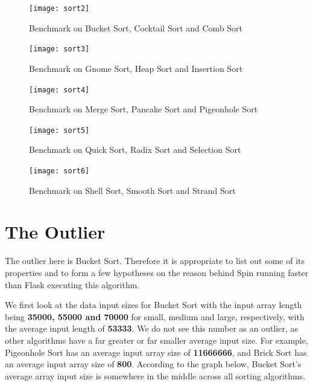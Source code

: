 \bigskip
\begin{figure}[hp]
\centering
\texttt{[image: sort2]}
\caption{\footnotesize{Benchmark on Bucket Sort, Cocktail Sort and Comb Sort}}
\captionsetup{aboveskip=0pt,font=it}
\end{figure}
\bigskip

\bigskip
\begin{figure}[hp]
\centering
\texttt{[image: sort3]}
\caption{\footnotesize{Benchmark on Gnome Sort, Heap Sort and Insertion Sort}}
\captionsetup{aboveskip=0pt,font=it}
\end{figure}
\bigskip

\bigskip
\begin{figure}[hp]
\centering
\texttt{[image: sort4]}
\caption{\footnotesize{Benchmark on Merge Sort, Pancake Sort and Pigeonhole Sort}}
\captionsetup{aboveskip=0pt,font=it}
\end{figure}
\bigskip

\newpage
\bigskip
\begin{figure}[hp]
\centering
\texttt{[image: sort5]}
\caption{\footnotesize{Benchmark on Quick Sort, Radix Sort and Selection Sort}}
\captionsetup{aboveskip=0pt,font=it}
\end{figure}
\bigskip

\bigskip
\begin{figure}[hp]
\centering
\texttt{[image: sort6]}
\caption{\footnotesize{Benchmark on Shell Sort, Smooth Sort and Strand Sort}}
\captionsetup{aboveskip=0pt,font=it}
\end{figure}
\bigskip

\bigskip
\section{The Outlier}

The outlier here is Bucket Sort. Therefore it is appropriate to list out some of its properties and to form a few hypotheses on the reason behind Spin running faster than Flask executing this algorithm.

We first look at the data input sizes for Bucket Sort with the input array length being \textbf{35000, 55000 and 70000} for small, medium and large, respectively, with the average input length of \textbf{53333}. We do not see this number as an outlier, as other algorithms have a far greater or far smaller average input size. For example, Pigeonhole Sort has an average input array size of \textbf{11666666}, and Brick Sort has an average input array size of \textbf{800}. According to the graph below, Bucket Sort's average array input size is somewhere in the middle across all sorting algorithms.

